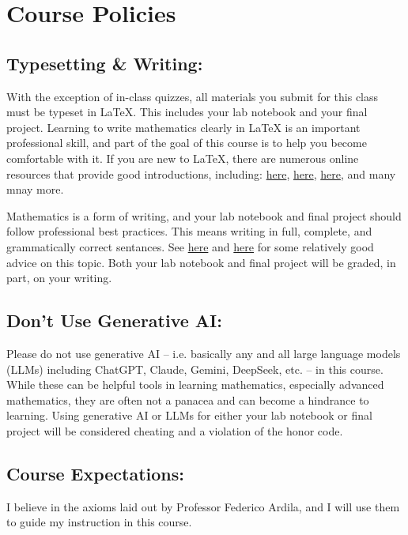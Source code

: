 \documentclass[11pt,letterpaper]{article}
\newcommand{\pageheading}[1]{\section*{#1}\addcontentsline{toc}{section}{#1}}
\begin{document}
\endgroup
\clearpage
\pageheading{Course Policies}

\subsection*{Typesetting \& Writing:}

With the exception of in-class quizzes, all materials you submit for this class must be typeset in LaTeX. This includes your lab notebook and your final project. Learning to write mathematics clearly in LaTeX is an important professional skill, and part of the goal of this course is to help you become comfortable with it. If you are new to LaTeX, there are numerous online resources that provide good introductions, including: \href{https://www.overleaf.com/learn/latex/Learn\_LaTeX\_in\_30\_minutes}{here}, \href{https://www.overleaf.com/learn/latex/Learn\_LaTeX\_in\_30\_minutes}{here}, \href{https://www.math.cmu.edu/~cnewstea/teaching/old/teaching/21-128-F15/latex-handout.pdf}{here}, and many mnay more.

Mathematics is a form of writing, and your lab notebook and final project should follow professional best practices. This means writing in full, complete, and grammatically correct sentances. See \href{https://math.mit.edu/~poonen/papers/writing.pdf}{here} and \href{https://www.math.ucla.edu/~pak/papers/how-to-write1.pdf}{here} for some relatively good advice on this topic. Both your lab notebook and final project will be graded, in part, on your writing.

\subsection*{Don't Use Generative AI:}

Please do not use generative AI -- i.e. basically any and all large language models (LLMs) including ChatGPT, Claude, Gemini, DeepSeek, etc. -- in this course. While these can be helpful tools in learning mathematics, especially advanced mathematics, they are often not a panacea and can become a hindrance to learning. Using generative AI or LLMs for either your lab notebook or final project will be considered cheating and a violation of the honor code.

\subsection*{Course Expectations:}

I believe in the axioms laid out by Professor Federico Ardila, and I will use them to guide my instruction in this course.
\end{document}
